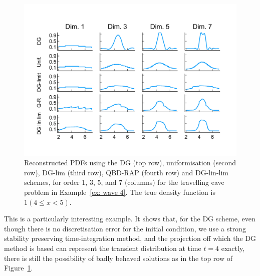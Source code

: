 \begin{example}
\begin{figure}[h]
	\centering
	\includegraphics[width=\textwidth,trim={0cm 1.25cm 0cm 1.25cm},clip]{chapter6/figs/wave/fun4/pdfs_formatted.pdf}
	\caption{Reconstructed PDFs using the DG (top row), uniformisation (second row), DG-lim (third row), QBD-RAP (fourth row) and DG-lin-lim schemes, for order 1, 3, 5, and 7 (columns) for the travelling eave problem in Example~\ref{ex: wave 4}. The true density function is \(1(4\leq x<5)\).}
	\label{fig: pdf wave fun 4}
\end{figure} 

This is a particularly interesting example. It shows that, for the DG scheme, even though there is no discretisation error for the initial condition, we use a strong stability preserving time-integration method, and the projection off which the DG method is based can represent the transient distribution at time \(t=4\) exactly, there is still the possibility of badly behaved solutions as in the top row of Figure~\ref{fig: pdf wave fun 4}. 
\exampleFloatBarrier
\end{example}

